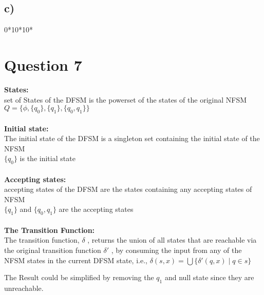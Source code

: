 \documentclass[11pt]{article}
\begin{document}
\subsection*{c)}
0*10*10*

\section*{Question 7}
\textbf{States:} \\
set of States of the DFSM is the powerset of the states of the original NFSM \\
$Q = \{\phi, \{q_0\}, \{q_1\}, \{q_0, q_1\}\}$ \\
\\
\textbf{Initial state:} \\
The initial state of the DFSM is a singleton set containing the initial state of the NFSM \\
$\{q_0\}$ is the initial state \\
\\
\textbf{Accepting states:} \\
accepting states of the DFSM are the states containing any accepting states of NFSM \\
$\{q_1\}$ and $\{q_0, q_1\}$ are the accepting states \\
\\
\textbf{The Transition Function:} \\
The transition function, $\delta$ , returns the union of all states that are
reachable via the original transition function $\delta'$ , by consuming the
input from any of the NFSM states in the current DFSM state, i.e.,
$\delta(s, x) = \bigcup \{ \delta'(q, x) \mid q \in s \}$


The Result could be simplified by removing the $q_1$ and null state since they
are unreachable.
\end{document}
